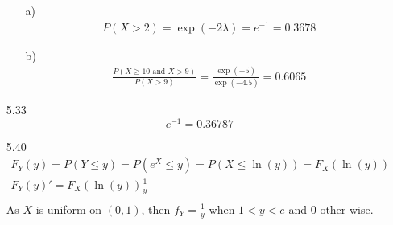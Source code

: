 \documentclass{article}
\begin{document}
\begin{itemize}
    \begin{itemize}
        \item [a)]    \begin{align*}
            P(X>2) = \exp(-2\lambda ) = e^{-1}= 0.3678
        \end{align*}
        \item [b)] 
        \begin{align*}
            \frac{P(X\geq10 \text{ and } X>9)}{P(X>9)} = \frac{\exp(-5)}{\exp(-4.5)} = 0.6065
        \end{align*}
    \end{itemize}
    \item [5.33]
    \[e^{-1}=0.36787\]
    \item [5.40]
    \begin{align*}
        F_Y(y)=P(Y\leq y)=P(e^X\leq y)=P(X\leq \ln(y))=F_X(\ln(y))\\
        F_Y(y)' = F_X(\ln(y))\frac{1}{y}\\
    \end{align*}
    As \(X\) is uniform on \((0,1)\), then \(f_Y = \frac{1}{y}\) when \(1<y<e\) and 0 other wise.
\end{itemize}
\end{document}
